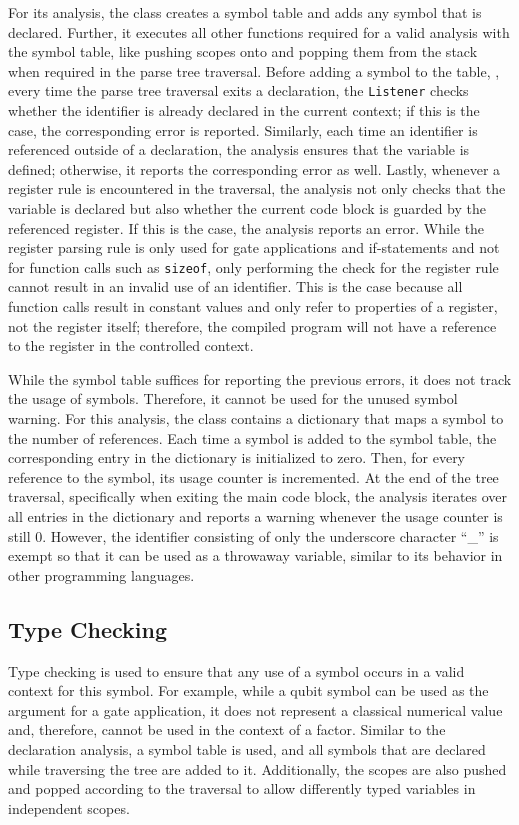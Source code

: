 For its analysis, the class creates a symbol table and adds any symbol that is declared. Further, it executes all other functions required for a valid analysis with the symbol table, like pushing scopes onto and popping them from the stack when required in the parse tree traversal. Before adding a symbol to the table, \ie, every time the parse tree traversal exits a declaration, the \texttt{Listener} checks whether the identifier is already declared in the current context; if this is the case, the corresponding error is reported. Similarly, each time an identifier is referenced outside of a declaration, the analysis ensures that the variable is defined; otherwise, it reports the corresponding error as well. Lastly, whenever a register rule is encountered in the traversal, the analysis not only checks that the variable is declared but also whether the current code block is guarded by the referenced register. If this is the case, the analysis reports an error. While the register parsing rule is only used for gate applications and if-statements and not for function calls such as \texttt{sizeof}, only performing the check for the register rule cannot result in an invalid use of an identifier. This is the case because all function calls result in constant values and only refer to properties of a register, not the register itself; therefore, the compiled program will not have a reference to the register in the controlled context.

While the symbol table suffices for reporting the previous errors, it does not track the usage of symbols. Therefore, it cannot be used for the unused symbol warning. For this analysis, the class contains a dictionary that maps a symbol to the number of references. Each time a symbol is added to the symbol table, the corresponding entry in the dictionary is initialized to zero. Then, for every reference to the symbol, its usage counter is incremented. At the end of the tree traversal, specifically when exiting the main code block, the analysis iterates over all entries in the dictionary and reports a warning whenever the usage counter is still $0$. However, the identifier consisting of only the underscore character ``\_'' is exempt so that it can be used as a throwaway variable, similar to its behavior in other programming languages.

\subsection{Type Checking}
\label{sec:implementation_typeCheckingAnalayis}
Type checking is used to ensure that any use of a symbol occurs in a valid context for this symbol. For example, while a qubit symbol can be used as the argument for a gate application, it does not represent a classical numerical value and, therefore, cannot be used in the context of a factor. Similar to the declaration analysis, a symbol table is used, and all symbols that are declared while traversing the tree are added to it. Additionally, the scopes are also pushed and popped according to the traversal to allow differently typed variables in independent scopes.

